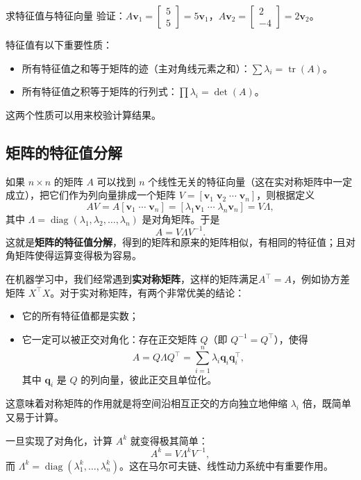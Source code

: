 \begin{example}{求特征值与特征向量}{}
    验证：\(A\mathbf{v}_1 =
        \begin{bmatrix}5\\5
    \end{bmatrix} = 5\mathbf{v}_1\)，\(A\mathbf{v}_2 =
        \begin{bmatrix}2\\-4
    \end{bmatrix}=2\mathbf{v}_2\)。
\end{example}

特征值有以下重要性质：
\begin{itemize}
    \item 所有特征值之和等于矩阵的迹（主对角线元素之和）：\(\sum \lambda_i = \operatorname{tr}(A)\)。
    \item 所有特征值之积等于矩阵的行列式：\(\prod \lambda_i = \det(A)\)。
\end{itemize}
这两个性质可以用来校验计算结果。

\subsection{矩阵的特征值分解}

如果 \(n \times n\) 的矩阵 \(A\) 可以找到 \(n\) 个线性无关的特征向量（这在实对称矩阵中一定成立），把它们作为列向量排成一个矩阵 \(V = [\mathbf{v}_1 \;\mathbf{v}_2 \;\cdots\; \mathbf{v}_n]\)，则根据定义
\[
    A V = A [\mathbf{v}_1 \;\cdots\; \mathbf{v}_n] = [\lambda_1\mathbf{v}_1 \;\cdots\; \lambda_n\mathbf{v}_n] = V \Lambda,
\]
其中 \(\Lambda = \operatorname{diag}(\lambda_1, \lambda_2, \dots, \lambda_n)\) 是对角矩阵。于是
\[
    A = V \Lambda V^{-1}.
\]
这就是\textbf{矩阵的特征值分解}，得到的矩阵和原来的矩阵相似，有相同的特征值；且对角矩阵使得运算变得极为容易。

在机器学习中，我们经常遇到\textbf{实对称矩阵}，这样的矩阵满足$A^\top = A$，例如协方差矩阵 \(X^\top X\)。对于实对称矩阵，有两个非常优美的结论：
\begin{itemize}
    \item 它的所有特征值都是实数；
    \item 它一定可以被正交对角化：存在正交矩阵 \(Q\)（即 \(Q^{-1} = Q^\top\)），使得
        \[
            A = Q \Lambda Q^\top = \sum_{i=1}^n \lambda_i \mathbf{q}_i \mathbf{q}_i^\top,
        \]
        其中 \(\mathbf{q}_i\) 是 \(Q\) 的列向量，彼此正交且单位化。
\end{itemize}
这意味着对称矩阵的作用就是将空间沿相互正交的方向独立地伸缩 \(\lambda_i\) 倍，既简单又易于计算。

一旦实现了对角化，计算 \(A^k\) 就变得极其简单：
\[
    A^k = V \Lambda^k V^{-1},
\]
而 \(\Lambda^k = \operatorname{diag}(\lambda_1^k, \dots, \lambda_n^k)\)。这在马尔可夫链、线性动力系统中有重要作用。

